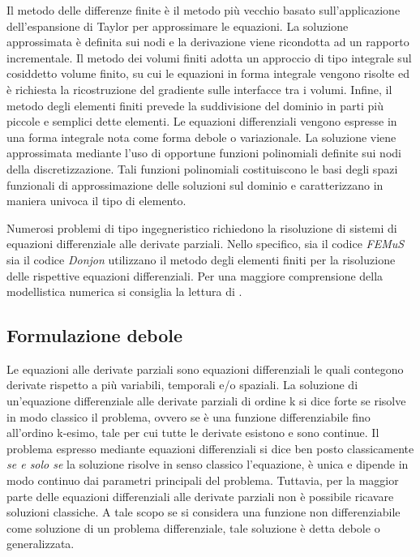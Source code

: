 Il metodo delle differenze finite è il metodo più vecchio basato 
sull'applicazione dell'espansione di Taylor per approssimare le equazioni. La soluzione approssimata è definita
sui nodi e la derivazione viene ricondotta ad un rapporto incrementale. 
Il metodo dei volumi finiti adotta un approccio di tipo integrale sul cosiddetto volume finito, su cui le equazioni in forma integrale vengono risolte ed è
richiesta la ricostruzione del gradiente sulle interfacce tra i volumi. 
Infine, il metodo degli elementi finiti prevede la suddivisione del dominio in parti più piccole e semplici
dette elementi. Le equazioni differenziali vengono espresse in una forma integrale nota
come forma debole o variazionale.
La soluzione viene approssimata mediante l'uso
di opportune funzioni polinomiali definite sui nodi della discretizzazione. Tali funzioni
polinomiali costituiscono le basi degli spazi funzionali di approssimazione delle soluzioni
sul dominio e caratterizzano in maniera univoca il tipo di elemento.

Numerosi problemi di tipo ingegneristico richiedono la risoluzione
di sistemi di equazioni differenziale alle derivate parziali. 
Nello specifico, sia il codice \textit{FEMuS} sia il codice \textit{Donjon} utilizzano 
il metodo degli elementi finiti per la risoluzione delle rispettive equazioni differenziali. 
Per una maggiore comprensione della modellistica numerica si consiglia 
la lettura di \cite{quarteroni2016modellistica}.

\subsection{Formulazione debole}

Le equazioni alle derivate parziali sono equazioni differenziali 
le quali contegono derivate rispetto a più variabili, temporali e/o spaziali.
La soluzione di un'equazione differenziale alle derivate parziali 
di ordine k si dice forte se risolve in modo classico il problema,
ovvero se è una funzione differenziabile fino all'ordino k-esimo,
tale per cui tutte le derivate esistono e sono continue.
Il problema espresso mediante equazioni differenziali si dice ben
posto classicamente \textit{se
e solo se} la soluzione risolve in senso classico l’equazione, è unica e dipende in modo
continuo dai parametri principali del problema. 
Tuttavia, per la maggior parte delle equazioni
differenziali alle derivate parziali non è possibile ricavare soluzioni classiche. 
A tale scopo se si considera una funzione non differenziabile come soluzione di un problema differenziale,
tale soluzione è detta debole o generalizzata.

